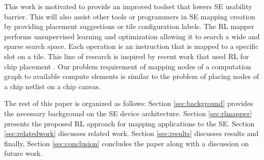 This work is motivated to provide an improved toolset that lowers SE usability barrier.
This will also assist other tools or programmers in SE mapping creation by providing placement suggestions or tile configuration labels.
The RL mapper performs unsupervised learning and optimization allowing it to search a wide and sparse search space. 
Each operation is an instruction that is mapped to a specific slot on a tile.
This line of research is inspired by recent work that used RL for chip placement \cite{mirhoseini2020chip}.
Our problem requirement of mapping nodes of a computation graph to available compute elements is similar to the problem of placing nodes of a chip netlist on a chip canvas. 

The rest of this paper is organized as follows: Section \ref{sec:background} provides the necessary background on the SE device architecture.
Section \ref{sec:rlmapper} presents the proposed RL approach for mapping applications to the SE.
Section \ref{sec:relatedwork} discusses related work.
Section \ref{sec:results} discusses results and finally, Section \ref{sec:conclusion} concludes the paper along with a discussion on future work.